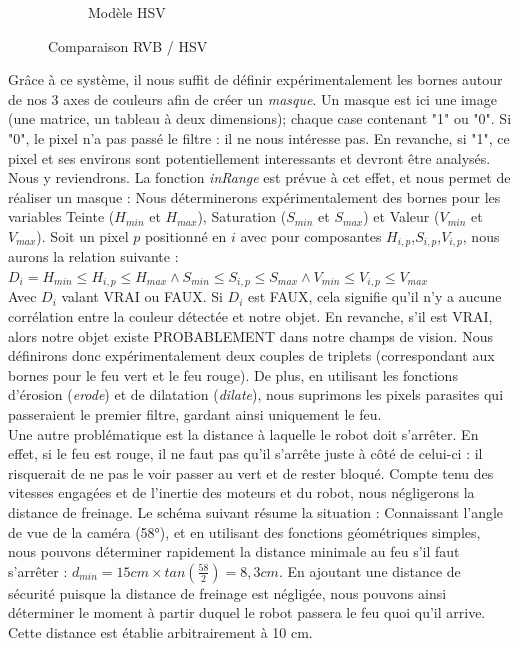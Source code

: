 \begin{itemize}
\begin{figure}[H]
\begin{subfigure}[h]{0.35\textwidth}
					        \caption{Modèle HSV}
					    \end{subfigure}
					    \caption{Comparaison RVB / HSV}
					\end{figure}
					Grâce à ce système, il nous suffit de définir expérimentalement les bornes autour de nos 3 axes de couleurs afin de créer un \textit{masque}. Un masque est ici une image (une matrice, un tableau à deux dimensions); chaque case contenant "1" ou "0". Si "0", le pixel n'a pas passé le filtre : il ne nous intéresse pas. En revanche, si "1", ce pixel et ses environs sont potentiellement interessants et devront être analysés. Nous y reviendrons.
					La fonction \textit{inRange} est prévue à cet effet, et nous permet de réaliser un masque : 
					Nous déterminerons expérimentalement des bornes pour les variables Teinte ($H_{min}$ et $H_{max}$), Saturation ($S_{min}$ et $S_{max}$) et Valeur ($V_{min}$ et $V_{max}$). Soit un pixel $p$ positionné en $i$ avec pour composantes $H_{i,p}$,$S_{i,p}$,$V_{i,p}$, nous aurons la relation suivante :
					\\ 
					$D_i = H_{min} \leqslant H_{i,p} \leqslant H_{max} 	\land S_{min} \leqslant S_{i,p} \leqslant S_{max} \land V_{min} \leqslant V_{i,p} \leqslant V_{max}$ \cite{bib20}
					\\
					Avec $D_i$ valant VRAI ou FAUX. Si $D_i$ est FAUX, cela signifie qu'il n'y a aucune corrélation entre la couleur détectée et notre objet. En revanche, s'il est VRAI, alors notre objet existe PROBABLEMENT dans notre champs de vision. Nous définirons donc expérimentalement deux couples de triplets (correspondant aux bornes pour le feu vert et le feu rouge). De plus, en utilisant les fonctions d'érosion (\textit{erode}) et de dilatation (\textit{dilate}), nous suprimons les pixels parasites qui passeraient le premier filtre, gardant ainsi uniquement le feu.
					\\

					Une autre problématique est la distance à laquelle le robot doit s'arrêter. En effet, si le feu est rouge, il ne faut pas qu'il s'arrête juste à côté de celui-ci : il risquerait de ne pas le voir passer au vert et de rester bloqué. Compte tenu des vitesses engagées et de l'inertie des moteurs et du robot, nous négligerons la distance de freinage.
					Le schéma suivant résume la situation :
					Connaissant l'angle de vue de la caméra (58°)\cite{bib18}, et en utilisant des fonctions géométriques simples, nous pouvons déterminer rapidement la distance minimale au feu s'il faut s'arrêter : $d_{min} = 15 cm \times tan(\frac{58}{2}) = 8,3 cm$. En ajoutant une distance de sécurité puisque la distance de freinage est négligée, nous pouvons ainsi déterminer le moment à partir duquel le robot passera le feu quoi qu'il arrive. Cette distance est établie arbitrairement à 10 cm.\\


\end{itemize}

